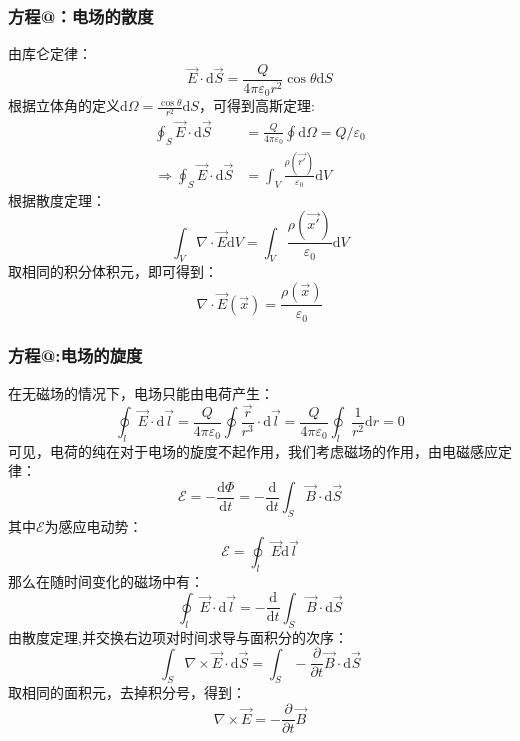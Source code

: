 \documentclass[12pt]{article}
\makeatletter
\newcommand{\Rmnum}[1]{\expandafter\@slowromancap\romannumeral #1@}
\makeatother
\begin{document}
\subsubsection{方程\Rmnum{1}：电场的散度}
由库仑定律：
\begin{equation}
    \Vec{E}\cdot\mathrm{d}\Vec{S}=\frac{Q}{4\pi\varepsilon_0r^2}\cos{\theta}\mathrm{d}S
\end{equation}
根据立体角的定义$\mathrm{d}\Omega=\frac{\cos{\theta}}{r^2}\mathrm{d}S$，可得到高斯定理:
\begin{equation}
\begin{split}
    \oint_S \Vec{E}\cdot\mathrm{d}\Vec{S}&=\frac{Q}{4\pi\varepsilon_0}\oint\mathrm{d}\Omega=Q/\varepsilon_0\\
    \Rightarrow \oint_S \Vec{E}\cdot \mathrm{d}\Vec{S}&=\int_V \frac{\rho(\Vec{r'})}{\varepsilon_0}\mathrm{d}V
\end{split}
\end{equation}
根据散度定理：
\begin{equation}
    \int_V \nabla\cdot\Vec{E}\mathrm{d}V=\int_V \frac{\rho(\Vec{x'})}{\varepsilon_0}\mathrm{d}V
\end{equation}
取相同的积分体积元，即可得到：
\begin{equation}
    \nabla\cdot\Vec{E}(\Vec{x})=\frac{\rho(\Vec{x})}{\varepsilon_0}
\end{equation}
\subsubsection{方程\Rmnum{2}:电场的旋度}
在无磁场的情况下，电场只能由电荷产生：
\begin{equation}
    \oint_l \Vec{E}\cdot \mathrm{d}\Vec{l}=\frac{Q}{4\pi \varepsilon_0}\oint \frac{\Vec{r}}{r^3}\cdot\mathrm{d}\Vec{l}=\frac{Q}{4\pi\varepsilon_0}\oint_l \frac{1}{r^2} \mathrm{d}r=0
\end{equation}
可见，电荷的纯在对于电场的旋度不起作用，我们考虑磁场的作用，由电磁感应定律：
\begin{equation}
    \mathcal{E}=-\frac{\mathrm{d}\Phi}{\mathrm{d}t}=-\frac{\mathrm{d}}{\mathrm{d}t}\int_S \Vec{B}\cdot\mathrm{d}\Vec{S}
\end{equation}
其中$\mathcal{E}$为感应电动势：
\begin{equation}
    \mathcal{E}=\oint_l \Vec{E}\mathrm{d}\Vec{l} 
\end{equation}
那么在随时间变化的磁场中有：
\begin{equation}
    \oint_l \Vec{E}\cdot\mathrm{d}\Vec{l}=-\frac{\mathrm{d}}{\mathrm{d}t}\int_S \Vec{B}\cdot\mathrm{d}\Vec{S}
\end{equation}
由散度定理,并交换右边项对时间求导与面积分的次序：
\begin{equation}
    \int_S \nabla\times \Vec{E}\cdot\mathrm{d}\Vec{S}=\int_S -\frac{\partial }{\partial t}\Vec{B}\cdot\mathrm{d}\Vec{S}
\end{equation}
取相同的面积元，去掉积分号，得到：
\begin{equation}
    \nabla\times \Vec{E}=-\frac{\partial}{\partial t}\Vec{B}
\end{equation}
\end{document}
